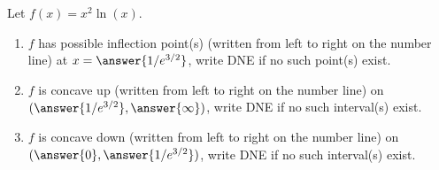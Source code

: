 \documentclass{ximera}
\author{Gregory Hartman \and Matthew Carr}
\begin{document}
\begin{exercise}






Let $f(x)=x^{2}\ln(x)$.
\begin{enumerate}
\item		$f$ has possible inflection point(s) (written from left to right on the number line) at $x=\answer{1/e^{3/2}}$, write DNE if no such point(s) exist.
\item		$f$ is concave up (written from left to right on the number line) on $(\answer{1/e^{3/2}},\answer{\infty})$, write DNE if no such interval(s) exist.
\item		$f$ is concave down (written from left to right on the number line) on $(\answer{0},\answer{1/e^{3/2}})$, write DNE if no such interval(s) exist.
\end{enumerate}

\end{exercise}
\end{document}
